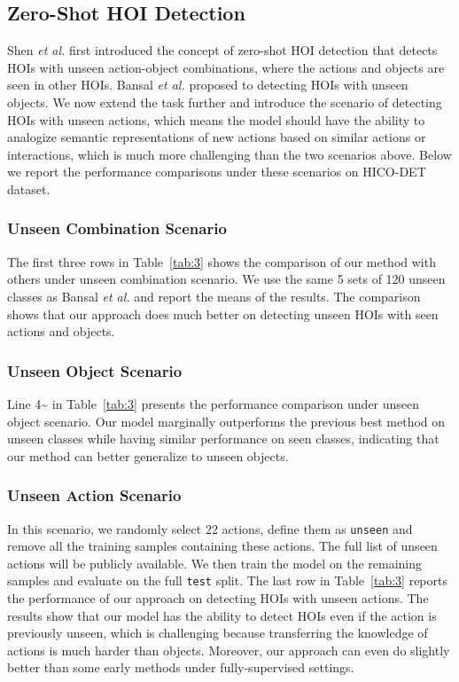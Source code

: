 \documentclass[sigconf,screen]{acmart}
\begin{document}
\subsection{Zero-Shot HOI Detection}

Shen \textit{et al.} \cite{shen2018scaling} first introduced the concept of zero-shot HOI detection that detects HOIs with unseen action-object combinations, where the actions and objects are seen in other HOIs. Bansal \textit{et al.} \cite{bansal2019detecting} proposed to detecting HOIs with unseen objects. We now extend the task further and introduce the scenario of detecting HOIs with unseen actions, which means the model should have the ability to analogize semantic representations of new actions based on similar actions or interactions, which is much more challenging than the two scenarios above. Below we report the performance comparisons under these scenarios on HICO-DET dataset.

\subsubsection{Unseen Combination Scenario}

The first three rows in Table~\ref{tab:3} shows the comparison of our method with others under unseen combination scenario. We use the same 5 sets of 120 unseen classes as Bansal \textit{et al.} and report the means of the results. The comparison shows that our approach does much better on detecting unseen HOIs with seen actions and objects.

\subsubsection{Unseen Object Scenario}

Line 4\;\textasciitilde{} in Table~\ref{tab:3} presents the performance comparison under unseen object scenario. Our model marginally outperforms the previous best method on unseen classes while having similar performance on seen classes, indicating that our method can better generalize to unseen objects.

\subsubsection{Unseen Action Scenario}

In this scenario, we randomly select 22 actions, define them as \verb|unseen| and remove all the training samples containing these actions. The full list of unseen actions will be publicly available. We then train the model on the remaining samples and evaluate on the full \verb|test| split. The last row in Table~\ref{tab:3} reports the performance of our approach on detecting HOIs with unseen actions. The results show that our model has the ability to detect HOIs even if the action is previously unseen, which is challenging because transferring the knowledge of actions is much harder than objects. Moreover, our approach can even do slightly better than some early methods under fully-supervised settings.
\end{document}
